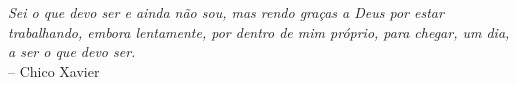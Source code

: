 $\!$\\
$\!$\\
$\!$\\
$\!$\\
$\!$\\
$\!$\\
$\!$\\
$\!$\\
$\!$\\
$\!$\\
$\!$\\
$\!$\\
$\!$\\
$\!$\\
$\!$\\
$\!$\\
$\!$\\
$\!$\\
$\!$\\
$\!$\\
$\!$\\
$\!$\\

\vspace*{\fill}
\begin{flushright}
\begin{minipage}{0.5\textwidth} %
    \begin{flushright}
        \textit{Sei o que devo ser e ainda não sou, mas rendo graças a Deus por estar trabalhando, embora lentamente, por dentro de mim próprio, para chegar, um dia, a ser o que devo ser.}\\
        \vspace{2mm}
        -- Chico Xavier
    \end{flushright}
\end{minipage}
\end{flushright}
\thispagestyle{empty}
\clearpage